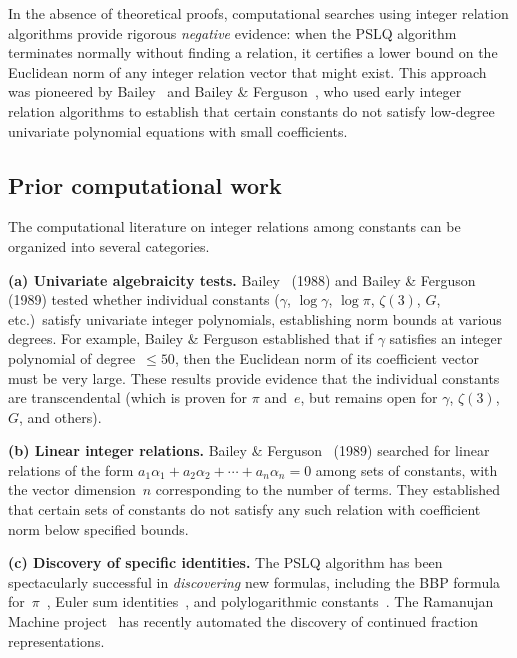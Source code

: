 \documentclass[11pt]{amsart}
\theoremstyle{remark}
\begin{document}
In the absence of theoretical proofs, computational searches using integer relation
algorithms provide rigorous \emph{negative} evidence: when the PSLQ
algorithm~\cite{FergusonBailey1991,FergusonBaileyArno1999} terminates normally
without finding a relation, it certifies a lower bound on the Euclidean norm of any
integer relation vector that might exist. This approach was pioneered by
Bailey~\cite{Bailey1988,BaileyBorwein2013} and Bailey \&
Ferguson~\cite{BaileyFerguson1989}, who used early integer relation algorithms to
establish that certain constants do not satisfy low-degree univariate polynomial
equations with small coefficients.

\subsection{Prior computational work}\label{ssec:prior}

The computational literature on integer relations among constants can be organized
into several categories.

\medskip\noindent\textbf{(a) Univariate algebraicity tests.}
Bailey~\cite{Bailey1988} (1988) and Bailey \& Ferguson~\cite{BaileyFerguson1989}
(1989) tested whether individual constants ($\gamma$, $\log\gamma$, $\log\pi$,
$\zeta(3)$, $G$, etc.)\ satisfy univariate integer polynomials, establishing norm
bounds at various degrees. For example, Bailey \& Ferguson established that if
$\gamma$ satisfies an integer polynomial of degree~$\le 50$, then the Euclidean norm
of its coefficient vector must be very large. These results provide evidence that the
individual constants are transcendental (which is proven for $\pi$ and~$e$, but
remains open for $\gamma$, $\zeta(3)$, $G$, and others).

\medskip\noindent\textbf{(b) Linear integer relations.}
Bailey \& Ferguson~\cite{BaileyFerguson1989} (1989) searched for linear relations of
the form $a_1\alpha_1 + a_2\alpha_2 + \cdots + a_n\alpha_n = 0$ among sets of
constants, with the vector dimension~$n$ corresponding to the number of terms. They
established that certain sets of constants do not satisfy any such relation with
coefficient norm below specified bounds.

\medskip\noindent\textbf{(c) Discovery of specific identities.}
The PSLQ algorithm has been spectacularly successful in \emph{discovering} new
formulas, including the BBP formula for~$\pi$~\cite{BaileyBorweinPlouffe1997}, Euler
sum identities~\cite{BaileyBorweinGirgensohn1994}, and polylogarithmic
constants~\cite{BaileyBroadhurst2001}. The Ramanujan Machine
project~\cite{Raayoni2021,Elimelech2024} has recently automated the discovery of
continued fraction representations.
\end{document}
